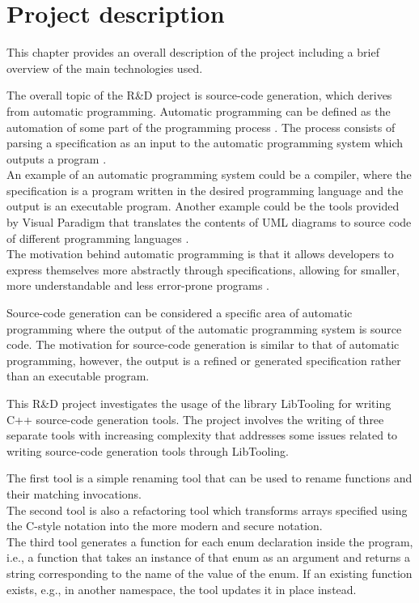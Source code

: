 \chapter{Project description}
This chapter provides an overall description of the project including a brief overview of the main technologies used.

The overall topic of the R\&D project is source-code generation, which derives from automatic programming. Automatic programming can be defined as the automation of some part of the programming process \cite{barrAutomaticProgramming1982}. The process consists of parsing a specification as an input to the automatic programming system which outputs a program \cite{novakjr.CS394PAutomatic}.\\
An example of an automatic programming system could be a compiler, where the specification is a program written in the desired programming language and the output is an executable program. Another example could be the tools provided by Visual Paradigm that translates the contents of UML diagrams to source code of different programming languages \cite{visualparadigmUMLCodeGeneration}.\\
The motivation behind automatic programming is that it allows developers to express themselves more abstractly through specifications, allowing for smaller, more understandable and less error-prone programs \cite{novakjr.CS394PAutomatic}.

Source-code generation can be considered a specific area of automatic programming where the output of the automatic programming system is source code. 
The motivation for source-code generation is similar to that of automatic programming, however, the output is a refined or generated specification rather than an executable program.

This R\&D project investigates the usage of the library LibTooling for writing C++ source-code generation tools. The project involves the writing of three separate tools with increasing complexity that addresses some issues related to writing source-code generation tools through LibTooling.

The first tool is a simple renaming tool that can be used to rename functions and their matching invocations.\\
The second tool is also a refactoring tool which transforms arrays specified using the C-style notation into the more modern and secure  notation. \\
The third tool generates a  function for each enum declaration inside the program, i.e., a function that takes an instance of that enum as an argument and returns a string corresponding to the name of the value of the enum. If an existing  function exists, e.g., in another namespace, the tool updates it in place instead.

